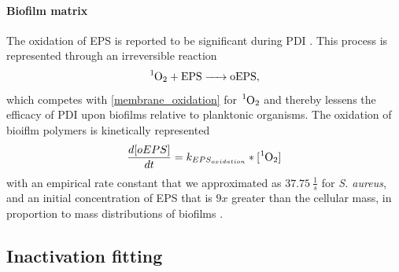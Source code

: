 \paragraph{Biofilm matrix} 
The oxidation of EPS is reported to be significant during PDI \cite{Beirao2014PhotodynamicPorphyrin}. This process is represented through an irreversible reaction
\begin{equation} \label{EPS_oxidation}
    \ce{^1O2 + EPS -> oEPS},
\end{equation}
which competes with \cref{membrane_oxidation} for $\ce{^1O2}$ and thereby lessens the efficacy of PDI upon biofilms relative to planktonic organisms. The oxidation of bioiflm polymers is kinetically represented  
\begin{equation} \label{EPS_oxidation_kinetics}
    \frac{d[oEPS]}{dt} = k_{EPS_{oxidation}}*[\ce{^1O2}]
\end{equation}
with an empirical rate constant that we approximated as $37.75~\frac{1}{s}$ for \textit{S. aureus}, and an initial concentration of EPS that is $9x$ greater than the cellular mass, in proportion to mass distributions of biofilms \cite{Flemming2010TheMatrix}.

\subsection{Inactivation fitting}

